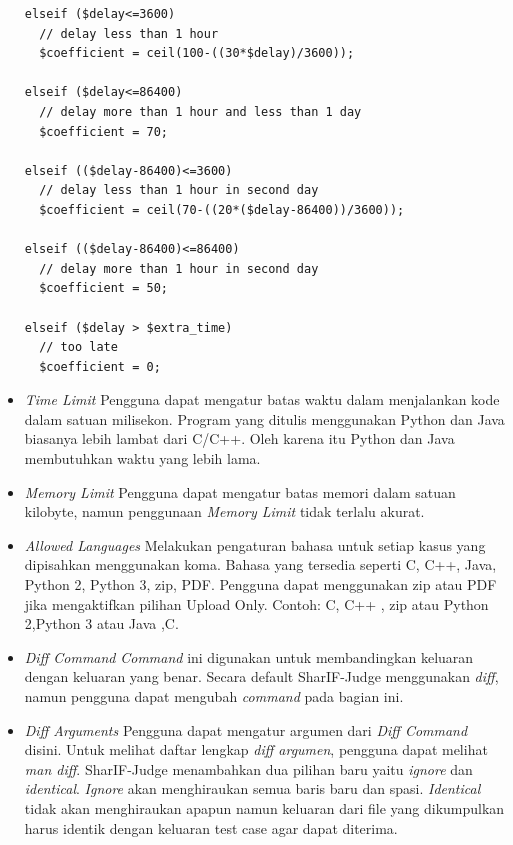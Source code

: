 \begin{itemize}
\begin{lstlisting}[basicstyle=\ttfamily, frame=single,
    columns=fullflexible, breaklines=true, numbers=none]
elseif ($delay<=3600)
  // delay less than 1 hour
  $coefficient = ceil(100-((30*$delay)/3600));

elseif ($delay<=86400)
  // delay more than 1 hour and less than 1 day
  $coefficient = 70;

elseif (($delay-86400)<=3600)
  // delay less than 1 hour in second day
  $coefficient = ceil(70-((20*($delay-86400))/3600));

elseif (($delay-86400)<=86400)
  // delay more than 1 hour in second day
  $coefficient = 50;

elseif ($delay > $extra_time)
  // too late
  $coefficient = 0;
    \end{lstlisting}

    \item \textit{Time Limit} \newline
    Pengguna dapat mengatur batas waktu dalam menjalankan kode dalam satuan milisekon. Program yang ditulis menggunakan Python dan Java biasanya lebih lambat dari C/C++. Oleh karena itu Python dan Java membutuhkan waktu yang lebih lama. \\
    \item \textit{Memory Limit} \newline
    Pengguna dapat mengatur batas memori dalam satuan kilobyte, namun penggunaan \textit{Memory Limit} tidak terlalu akurat.\\
    \item \textit{Allowed Languages} \newline
    Melakukan pengaturan bahasa untuk setiap kasus yang dipisahkan menggunakan koma. Bahasa yang tersedia seperti C, C++, Java, Python 2, Python 3, zip, PDF. Pengguna dapat menggunakan zip atau PDF jika mengaktifkan pilihan Upload Only. Contoh: C, C++ , zip atau Python 2,Python 3 atau Java ,C. \\
    \item \textit{Diff Command} \newline
    \textit{Command} ini digunakan untuk membandingkan keluaran dengan keluaran yang benar. Secara default SharIF-Judge menggunakan \textit{diff}, namun pengguna dapat mengubah \textit{command} pada bagian ini. \\
    \item \textit{Diff Arguments} \newline
    Pengguna dapat mengatur argumen dari \textit{Diff Command} disini. Untuk melihat daftar lengkap \textit{diff argumen}, pengguna dapat melihat \textit{man diff}. SharIF-Judge menambahkan dua pilihan baru yaitu \textit{ignore} dan \textit{identical}. \textit{Ignore} akan menghiraukan semua baris baru dan spasi. \textit{Identical} tidak akan menghiraukan apapun namun keluaran dari file yang dikumpulkan harus identik dengan keluaran test case agar dapat diterima. \\

\end{itemize}
